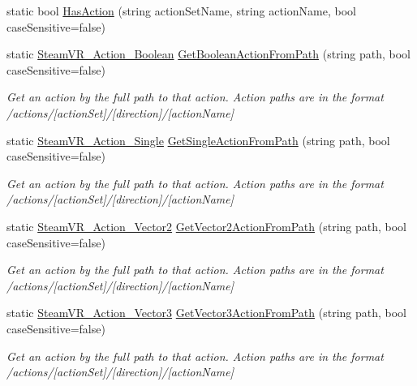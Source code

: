 \begin{DoxyCompactItemize}
static bool \mbox{\hyperlink{class_valve_1_1_v_r_1_1_steam_v_r___input_a04fc7868c6a4a357bc5f313a8b9096bf}{Has\+Action}} (string action\+Set\+Name, string action\+Name, bool case\+Sensitive=false)
\item 
static \mbox{\hyperlink{class_valve_1_1_v_r_1_1_steam_v_r___action___boolean}{Steam\+V\+R\+\_\+\+Action\+\_\+\+Boolean}} \mbox{\hyperlink{class_valve_1_1_v_r_1_1_steam_v_r___input_a98161a36c23334e4f8d303d02bc757aa}{Get\+Boolean\+Action\+From\+Path}} (string path, bool case\+Sensitive=false)
\begin{DoxyCompactList}\small\item\em Get an action by the full path to that action. Action paths are in the format /actions/\mbox{[}action\+Set\mbox{]}/\mbox{[}direction\mbox{]}/\mbox{[}action\+Name\mbox{]} \end{DoxyCompactList}\item 
static \mbox{\hyperlink{class_valve_1_1_v_r_1_1_steam_v_r___action___single}{Steam\+V\+R\+\_\+\+Action\+\_\+\+Single}} \mbox{\hyperlink{class_valve_1_1_v_r_1_1_steam_v_r___input_af5c12a8ff1d1f55fd17d93fc45f76511}{Get\+Single\+Action\+From\+Path}} (string path, bool case\+Sensitive=false)
\begin{DoxyCompactList}\small\item\em Get an action by the full path to that action. Action paths are in the format /actions/\mbox{[}action\+Set\mbox{]}/\mbox{[}direction\mbox{]}/\mbox{[}action\+Name\mbox{]} \end{DoxyCompactList}\item 
static \mbox{\hyperlink{class_valve_1_1_v_r_1_1_steam_v_r___action___vector2}{Steam\+V\+R\+\_\+\+Action\+\_\+\+Vector2}} \mbox{\hyperlink{class_valve_1_1_v_r_1_1_steam_v_r___input_afee92f1a25149c18f7a437ce301eb43b}{Get\+Vector2\+Action\+From\+Path}} (string path, bool case\+Sensitive=false)
\begin{DoxyCompactList}\small\item\em Get an action by the full path to that action. Action paths are in the format /actions/\mbox{[}action\+Set\mbox{]}/\mbox{[}direction\mbox{]}/\mbox{[}action\+Name\mbox{]} \end{DoxyCompactList}\item 
static \mbox{\hyperlink{class_valve_1_1_v_r_1_1_steam_v_r___action___vector3}{Steam\+V\+R\+\_\+\+Action\+\_\+\+Vector3}} \mbox{\hyperlink{class_valve_1_1_v_r_1_1_steam_v_r___input_af643be6e485a604b8155880d41fe1ace}{Get\+Vector3\+Action\+From\+Path}} (string path, bool case\+Sensitive=false)
\begin{DoxyCompactList}\small\item\em Get an action by the full path to that action. Action paths are in the format /actions/\mbox{[}action\+Set\mbox{]}/\mbox{[}direction\mbox{]}/\mbox{[}action\+Name\mbox{]} \end{DoxyCompactList}\item 

\end{DoxyCompactItemize}
